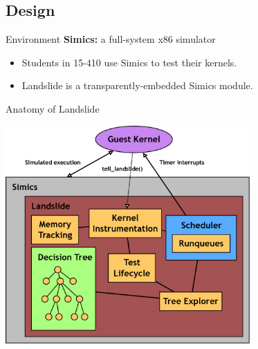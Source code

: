\documentclass[xcolor=dvipsnames]{beamer}
\begin{document}
\newcommand\done[1]{\textcolor{gray}{\em \small #1}}

%
%
%

\subsection{Design}

\begin{frame}{Environment}
	\textbf{Simics:} a full-system x86 simulator
	\begin{itemize}
		\item Students in 15-410 use Simics to test their kernels.
		\item Landslide is a transparently-embedded Simics module.
	\end{itemize}
\end{frame}

\begin{frame}{Anatomy of Landslide}
	\begin{center}
	\includegraphics[width=0.7\textwidth]{landslide.png}
	\end{center}
\end{frame}
\end{document}
